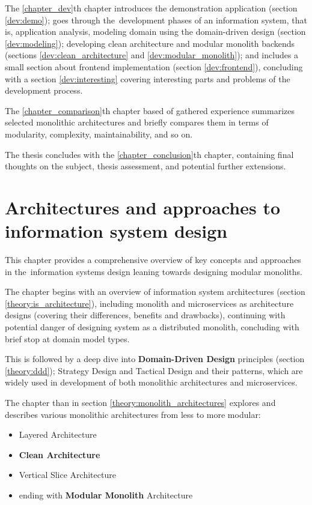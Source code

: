 The \ref{chapter_dev}th chapter introduces the demonstration application (section \ref{dev:demo}); goes through the~development phases of an information system, that is, application analysis, modeling domain using the domain-driven design (section \ref{dev:modeling}); developing clean architecture and modular monolith backends (sections \ref{dev:clean_architecture} and \ref{dev:modular_monolith}); and includes a small section about frontend implementation (section \ref{dev:frontend}), concluding with a section \ref{dev:interesting} covering interesting parts and problems of the development process.

The \ref{chapter_comparison}th chapter based of gathered experience summarizes selected monolithic architectures and briefly compares them in terms of modularity, complexity, maintainability, and so on.

The thesis concludes with the \ref{chapter_conclusion}th chapter, containing final thoughts on the subject, thesis assessment, and potential further extensions.

\chapter{Architectures and approaches to information system design}
\label{chapter_theory}
This chapter provides a comprehensive overview of key concepts and approaches in the~information systems design leaning towards designing modular monoliths.

The chapter begins with an overview of information system architectures (section \ref{theory:is_architecture}), including monolith and microservices as architecture designs (covering their differences, benefits and drawbacks), continuing with potential danger of designing system as a distributed monolith, concluding with brief stop at domain model types. 

This is followed by a deep dive into \textbf{Domain-Driven Design} principles (section \ref{theory:ddd}); Strategy Design and Tactical Design and their patterns, which are widely used in development of both monolithic architectures and microservices.

The chapter than in section \ref{theory:monolith_architectures} explores and describes various monolithic architectures from less to more modular:
\begin{itemize}
    \item  Layered Architecture
    \item \textbf{Clean Architecture}
    \item Vertical Slice Architecture
    \item ending with \textbf{Modular Monolith} Architecture
\end{itemize}

